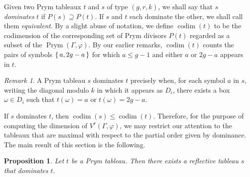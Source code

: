 \documentclass[11pt,reqno]{amsart}
\DeclareMathOperator{\codim}{codim}
\DeclareMathOperator{\Prym}{Prym}
\theoremstyle{definition}
\theoremstyle{problem}
\theoremstyle{plain}
\newtheorem{proposition}[definition]{Proposition}
\theoremstyle{remark}
\newtheorem{remark}[definition]{Remark}
\theoremstyle{theorem}
\numberwithin{equation}{section}
\numberwithin{figure}{section}
\begin{document}
Given two Prym tableaux $t$ and $s$ of type $(g,r,k)$, we shall say
that $s$ \textit{dominates} $t$ if $P(s) \supseteq P(t)$.  If $s$ and
$t$ each dominate the other, we shall call them \textit{equivalent}.
By a slight abuse of notation, we define $\codim(t)$ to be the
codimension of the corresponding set of Prym divisors $P(t)$ regarded
as a subset of the $\Prym(\Gamma,\varphi)$.  By our earlier remarks,
$\codim(t)$ counts the pairs of symbols $\set{a,2g-a}$ for which
$a \leq g-1$ and either $a$ or $2g-a$ appears in $t$.

\begin{remark}\label{rem:4}
  A Prym tableau $s$ dominates $t$ precisely when, for each symbol $a$
  in $s$, writing the diagonal modulo $k$ in which it appears as
  $D_i$, there exists a box $\omega \in D_i$ such that $t(\omega) = a$
  or $t(\omega) = 2g - a$.
\end{remark}

If $s$ dominates $t$, then $\codim(s) \leq \codim(t)$. Therefore, for
the purpose of computing the dimension of $V^r(\Gamma,\varphi)$, we
may restrict our attention to the tableaux that are maximal with
respect to the partial order given by dominance.  The main result of
this section is the following.

\begin{proposition}\label{prop:reflective}
  Let $t$ be a Prym tableau.  Then there exists a reflective tableau
  $s$ that dominates $t$.
\end{proposition}
\end{document}
